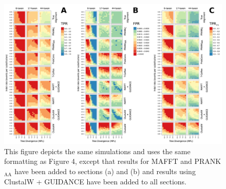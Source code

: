 \documentclass{article}
\newcommand{\pranka}{PRANK$_{\textrm{AA}}$\xspace}
\begin{document}
\makeatletter 
\renewcommand{\figurename}{Supplementary Figure}
\renewcommand{\thefigure}{S\@arabic\c@figure} 

\begin{figure}[t]
\begin{center}
\includegraphics[scale=0.8]{supp_fig1.pdf}
\end{center}
\caption{This figure depicts the same simulations and uses the same
  formatting as Figure 4, except that results for MAFFT and \pranka
  have been added to sections (a) and (b) and results using ClustalW +
  GUIDANCE have been added to all sections.}
\label{supp_fig1}
\end{figure}
\end{document}
